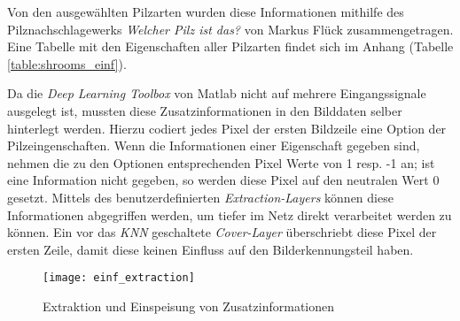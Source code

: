 Von den ausgewählten Pilzarten wurden diese Informationen mithilfe des Pilznachschlagewerks \textit{Welcher Pilz ist das?} von Markus Flück \cite{wpid} zusammengetragen. Eine Tabelle mit den Eigenschaften aller Pilzarten findet sich im Anhang (Tabelle \ref{table:shrooms_einf}).

Da die \textit{Deep Learning Toolbox} von Matlab nicht auf mehrere Eingangssignale ausgelegt ist, mussten diese Zusatzinformationen in den Bilddaten selber hinterlegt werden. Hierzu codiert jedes Pixel der ersten Bildzeile eine Option der Pilzeingenschaften. Wenn die Informationen einer Eigenschaft gegeben sind, nehmen die zu den Optionen entsprechenden Pixel Werte von 1 resp. -1 an; ist eine Information nicht gegeben, so werden diese Pixel auf den neutralen Wert 0 gesetzt. Mittels des benutzerdefinierten \textit{Extraction-Layers} können diese Informationen abgegriffen werden, um tiefer im Netz direkt verarbeitet werden zu können. Ein vor das \textit{KNN} geschaltete \textit{Cover-Layer} überschriebt diese Pixel der ersten Zeile, damit diese keinen Einfluss auf den Bilderkennungsteil haben.

\begin{figure}[h]
	\centering
	\texttt{[image: einf\_extraction]}
	\caption[Extraktion und Einspeisung von Zusatzinformationen]{Extraktion und Einspeisung von Zusatzinformationen}
	\label{img:extr_layer}
\end{figure}
 
 

